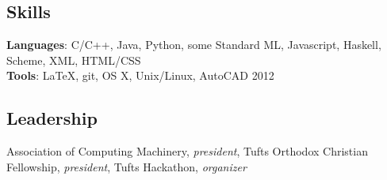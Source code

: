 \documentclass{article}
\newcommand{\skillNS}[2]{
  \textbf{#1}: #2
}
\begin{document}
\subsection*{Skills}
  \skillNS{Languages} {C/C++, Java, Python, some Standard ML, Javascript,
                      Haskell, Scheme, XML, HTML/CSS}\\
  \skillNS{Tools}     {LaTeX, git, OS X, Unix/Linux, AutoCAD 2012} \\

\subsection*{Leadership}
  Association of Computing Machinery, \textit{president}, Tufts Orthodox
  Christian Fellowship, \textit{president}, Tufts Hackathon,
  \textit{organizer}
\end{document}
